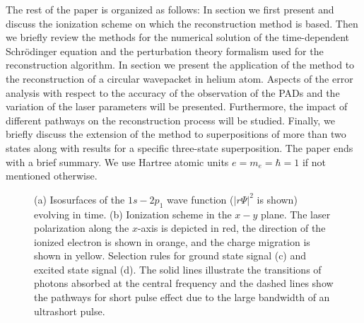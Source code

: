 The rest of the paper is organized as follows: In section 
we first present and discuss the ionization scheme on which the reconstruction method is based. Then we briefly review the methods for the numerical solution of the time-dependent Schr\"odinger equation and the perturbation theory formalism used for the reconstruction algorithm. In section 
we present the application of the method to the reconstruction of a circular wavepacket in helium atom. Aspects of the error analysis with respect to the accuracy of the observation of the PADs and the variation of the laser parameters will be presented. Furthermore, the impact of different pathways on the reconstruction process will be studied. Finally, we briefly discuss the extension of the method to superpositions of more than two states along with results for a specific three-state superposition. The paper ends with a brief summary. We use Hartree atomic units $e = m_e = \hbar =1$ if not mentioned otherwise.


\begin{figure}[t]
\centering
\caption{(a) Isosurfaces of the $1s-2p_1$ wave function ($|r\Psi|^2$ is shown) evolving in time. (b) Ionization scheme in the $x-y$ plane. The laser polarization along the $x$-axis is depicted in red, the direction of the ionized electron is shown in orange, and the charge migration is shown in yellow. Selection rules for ground state signal (c) and excited state signal (d). The solid lines illustrate the transitions of photons absorbed at the central frequency and the dashed lines show the pathways for short pulse effect due to the large bandwidth of an ultrashort pulse.
} 
  \label{fig:dynamic_visualization}
\end{figure}

